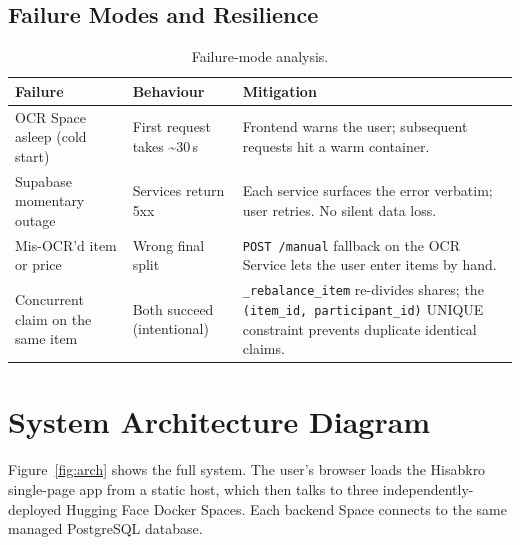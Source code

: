 \documentclass[11pt, a4paper]{article}
\begin{document}
\subsection{Failure Modes and Resilience}

\begin{table}[h!]
\centering
\caption{Failure-mode analysis.}
\begin{tabularx}{\textwidth}{l X X}
\toprule
\textbf{Failure} & \textbf{Behaviour} & \textbf{Mitigation} \\
\midrule
OCR Space asleep (cold start) & First request takes \textasciitilde 30\,s & Frontend warns the user; subsequent requests hit a warm container. \\
Supabase momentary outage & Services return 5xx & Each service surfaces the error verbatim; user retries. No silent data loss. \\
Mis-OCR'd item or price & Wrong final split & \texttt{POST /manual} fallback on the OCR Service lets the user enter items by hand. \\
Concurrent claim on the same item & Both succeed (intentional) & \texttt{\_rebalance\_item} re-divides shares; the \texttt{(item\_id, participant\_id)} UNIQUE constraint prevents duplicate identical claims. \\
\bottomrule
\end{tabularx}
\end{table}

\section{System Architecture Diagram}
\label{sec:diagram}

Figure~\ref{fig:arch} shows the full system. The user's browser loads the Hisabkro single-page app from a static host, which then talks to three independently-deployed Hugging Face Docker Spaces. Each backend Space connects to the same managed PostgreSQL database.
\end{document}
